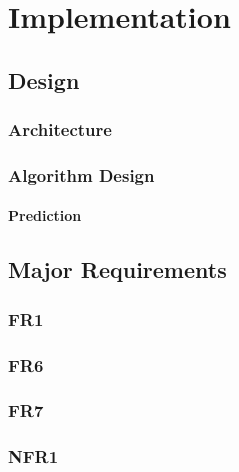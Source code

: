 
\chapter{Implementation}
\minitoc

\clearpage

\section{Design}

\subsection{Architecture}




\subsection{Algorithm Design}

\subsubsection{Prediction}\label{algorithm-design:prediction}


\section{Major Requirements}\label{impl:Major Requirements}

\subsection{FR1}

\subsection{FR6}\label{subsec:FR6}

\subsection{FR7}\label{subsec:FR7}

\subsection{NFR1}
